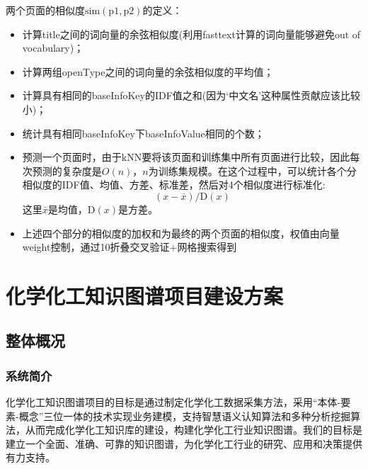 两个页面的相似度$\mathrm{sim(p1,p2)}$的定义：
\begin{itemize}
	\item 计算\textrm{title}之间的词向量的余弦相似度(利用\textrm{fasttext}计算的词向量能够避免out of vocabulary)；
	\item 计算两组\textrm{openType}之间的词向量的余弦相似度的平均值；
	\item 计算具有相同的\textrm{baseInfoKey}的\textrm{IDF}值之和(因为‘中文名’这种属性贡献应该比较小)；
	\item 统计具有相同\textrm{baseInfoKey}下\textrm{baseInfoValue}相同的个数；
	\item 预测一个页面时，由于\textrm{kNN}要将该页面和训练集中所有页面进行比较，因此每次预测的复杂度是$O(n)$，$n$为训练集规模。在这个过程中，可以统计各个分相似度的\textrm{IDF}值、均值、方差、标准差，然后对4个相似度进行标准化:
		\begin{displaymath}
			(x-\bar{x})/\mathrm{D}(x)
		\end{displaymath}
		这里$\bar{x}$是均值，$\mathrm{D}(x)$是方差。
	\item 上述四个部分的相似度的加权和为最终的两个页面的相似度，权值由向量\textrm{weight}控制，通过10折叠交叉验证$+$网格搜索得到
\end{itemize}

\section{化学化工知识图谱项目建设方案}
\subsection{整体概况}
\subsubsection{系统简介} 
化学化工知识图谱项目的目标是通过制定化学化工数据采集方法，采用``本体-要素-概念''三位一体的技术实现业务建模，支持智慧语义认知算法和多种分析挖掘算法，从而完成化学化工知识库的建设，构建化学化工行业知识图谱。我们的目标是建立一个全面、准确、可靠的知识图谱，为化学化工行业的研究、应用和决策提供有力支持。
